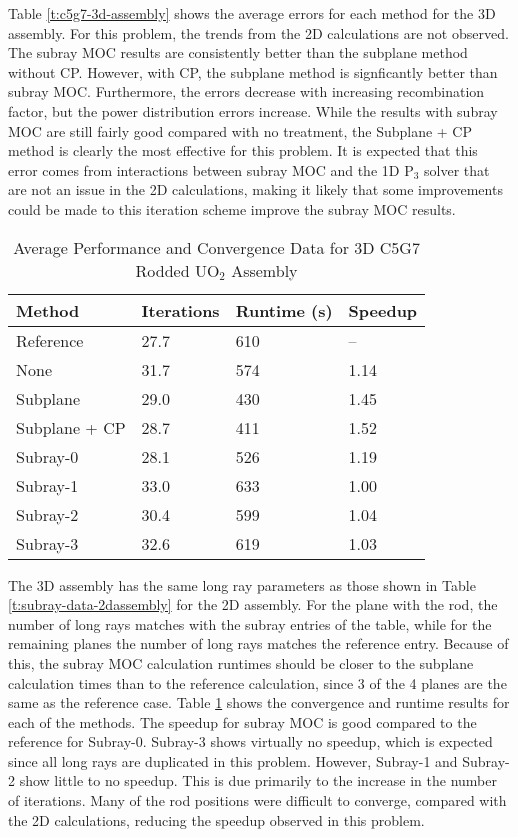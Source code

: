 Table \ref{t:c5g7-3d-assembly} shows the average errors for each method for the 3D assembly.  For this problem, the trends from the 2D calculations are not observed.  The subray MOC results are consistently better than the subplane method without CP.  However, with CP, the subplane method is signficantly better than subray MOC.  Furthermore, the \keff{} errors decrease with increasing recombination factor, but the power distribution errors increase.  While the results with subray MOC are still fairly good compared with no treatment, the Subplane + CP method is clearly the most effective for this problem.  It is expected that this error comes from interactions between subray MOC and the 1D P$_3$ solver that are not an issue in the 2D calculations, making it likely that some improvements could be made to this iteration scheme improve the subray MOC results.

\begin{table}[h]
    \centering
    \caption[3D C5G7 UO$_2$ Assembly Performance]{Average Performance and Convergence Data for 3D C5G7 Rodded UO$_2$ Assembly}\label{t:subray-performance-3Dassembly}
    \begin{tabular}{l l l l}\toprule
        Method & Iterations & Runtime (s) & Speedup \\\midrule
Reference     & 27.7 & 610 & --   \\
None          & 31.7 & 574 & 1.14 \\
Subplane      & 29.0 & 430 & 1.45 \\
Subplane + CP & 28.7 & 411 & 1.52 \\
Subray-0      & 28.1 & 526 & 1.19 \\
Subray-1      & 33.0 & 633 & 1.00 \\
Subray-2      & 30.4 & 599 & 1.04 \\
Subray-3      & 32.6 & 619 & 1.03 \\
        \bottomrule
    \end{tabular}
\end{table}

The 3D assembly has the same long ray parameters as those shown in Table \ref{t:subray-data-2dassembly} for the 2D assembly.  For the plane with the rod, the number of long rays matches with the subray entries of the table, while for the remaining planes the number of long rays matches the reference entry.  Because of this, the subray MOC calculation runtimes should be closer to the subplane calculation times than to the reference calculation, since 3 of the 4 planes are the same as the reference case.  Table \ref{t:subray-performance-3Dassembly} shows the convergence and runtime results for each of the methods.  The speedup for subray MOC is good compared to the reference for Subray-0.  Subray-3 shows virtually no speedup, which is expected since all long rays are duplicated in this problem.  However, Subray-1 and Subray-2 show little to no speedup.  This is due primarily to the increase in the number of iterations.  Many of the rod positions were difficult to converge, compared with the 2D calculations, reducing the speedup observed in this problem.

